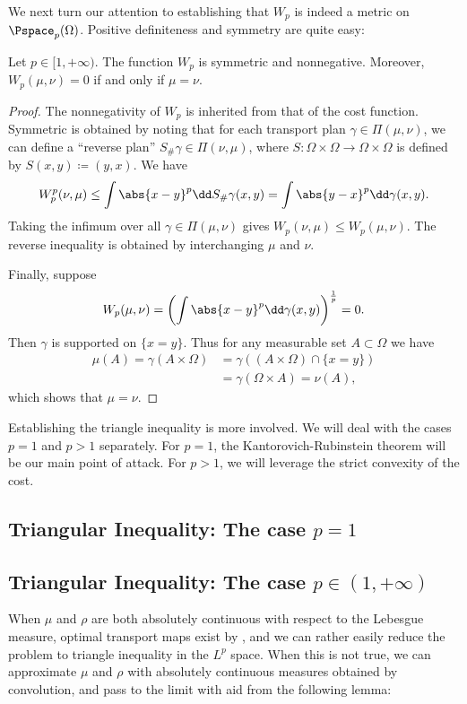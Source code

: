 \documentclass[oneside,reqno,letterpaper]{amsart}
\begin{document}
We next turn our attention to establishing that \(W_p\) is indeed a metric on \(\Pspace_p(\Omega)\).
Positive definiteness and symmetry are quite easy:
\begin{proposition}
  Let \(p \in [1, +\infty)\).
  The function \(W_p\) is symmetric and nonnegative.
  Moreover, \(W_p(\mu, \nu) = 0\) if and only if \(\mu = \nu\).
\end{proposition}
\begin{proof}
  The nonnegativity of \(W_p\) is inherited from that of the cost function.
  Symmetric is obtained by noting that for each transport plan \(\gamma \in \Pi(\mu, \nu)\), we can define a ``reverse plan'' \(S_{\#} \gamma \in \Pi(\nu, \mu)\), where \(S: \Omega \times \Omega \to \Omega \times \Omega\) is defined by \(S(x, y) \coloneqq (y, x)\).
  We have
  \[
    W_p^p(\nu, \mu)
    \leq \int \abs{x - y}^p \dd S_{\#} \gamma(x, y)
    = \int \abs{y - x}^p \dd \gamma(x, y).
  \]
  Taking the infimum over all \(\gamma \in \Pi(\mu, \nu)\) gives \(W_p(\nu, \mu) \leq W_p(\mu, \nu)\).
  The reverse inequality is obtained by interchanging \(\mu\) and \(\nu\).

  Finally, suppose
  \[
    W_p(\mu, \nu)
    = \left( \int \abs{x - y}^p \dd \gamma(x, y) \right)^{\frac{1}{p}}
    = 0.
  \]
  Then \(\gamma\) is supported on \(\{x = y\}\).
  Thus for any measurable set \(A \subset \Omega\) we have
  \begin{align*}
    \mu(A)
    = \gamma(A \times \Omega)
    &= \gamma\left( (A \times \Omega) \cap \{x = y\} \right) \\
    &= \gamma(\Omega \times A)
    = \nu(A),
  \end{align*}
  which shows that \(\mu = \nu\).
\end{proof}


Establishing the triangle inequality is more involved.
We will deal with the cases \(p = 1\) and \(p > 1\) separately.
For \(p = 1\), the Kantorovich-Rubinstein theorem will be our main point of attack.
For \(p > 1\), we will leverage the strict convexity of the cost.

\subsection{Triangular Inequality: The case \texorpdfstring{\(p = 1\)}{p = 1}}


\subsection{Triangular Inequality: The case \texorpdfstring{\(p \in (1, +\infty)\)}{p > 1}}
When \(\mu\) and \(\rho\) are both absolutely continuous with respect to the Lebesgue measure, optimal transport maps exist by , and we can rather easily reduce the problem to triangle inequality in the \(L^p\) space.
When this is not true, we can approximate \(\mu\) and \(\rho\) with absolutely continuous measures obtained by convolution, and pass to the limit with aid from the following lemma:
\end{document}
